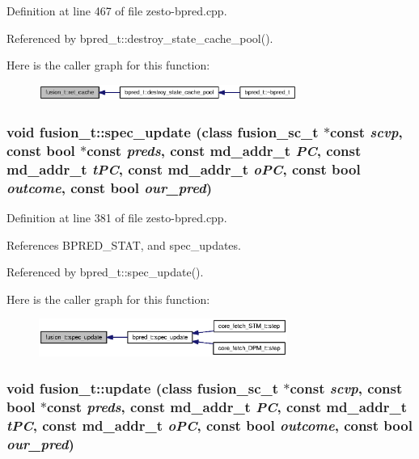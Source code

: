 Definition at line 467 of file zesto-bpred.cpp.

Referenced by bpred\_\-t::destroy\_\-state\_\-cache\_\-pool().

Here is the caller graph for this function:\nopagebreak
\begin{figure}[H]
\begin{center}
\leavevmode
\includegraphics[width=239pt]{classfusion__t_cd9d90c41c0eceaf5fdbc4aaac9f1edf_icgraph}
\end{center}
\end{figure}
\subsubsection[{spec\_\-update}]{\setlength{\rightskip}{0pt plus 5cm}void fusion\_\-t::spec\_\-update (class {\bf fusion\_\-sc\_\-t} $\ast$const  {\em scvp}, \/  const bool $\ast$const  {\em preds}, \/  const {\bf md\_\-addr\_\-t} {\em PC}, \/  const {\bf md\_\-addr\_\-t} {\em tPC}, \/  const {\bf md\_\-addr\_\-t} {\em oPC}, \/  const bool {\em outcome}, \/  const bool {\em our\_\-pred})\hspace{0.3cm}{\tt  [virtual]}}\label{classfusion__t_dc1a1da27e0dff07da77684e8c5a1fb8}




Definition at line 381 of file zesto-bpred.cpp.

References BPRED\_\-STAT, and spec\_\-updates.

Referenced by bpred\_\-t::spec\_\-update().

Here is the caller graph for this function:\nopagebreak
\begin{figure}[H]
\begin{center}
\leavevmode
\includegraphics[width=230pt]{classfusion__t_dc1a1da27e0dff07da77684e8c5a1fb8_icgraph}
\end{center}
\end{figure}
\subsubsection[{update}]{\setlength{\rightskip}{0pt plus 5cm}void fusion\_\-t::update (class {\bf fusion\_\-sc\_\-t} $\ast$const  {\em scvp}, \/  const bool $\ast$const  {\em preds}, \/  const {\bf md\_\-addr\_\-t} {\em PC}, \/  const {\bf md\_\-addr\_\-t} {\em tPC}, \/  const {\bf md\_\-addr\_\-t} {\em oPC}, \/  const bool {\em outcome}, \/  const bool {\em our\_\-pred})\hspace{0.3cm}{\tt  [virtual]}}\label{classfusion__t_cdf80727ed478611329437f387895bc4}




